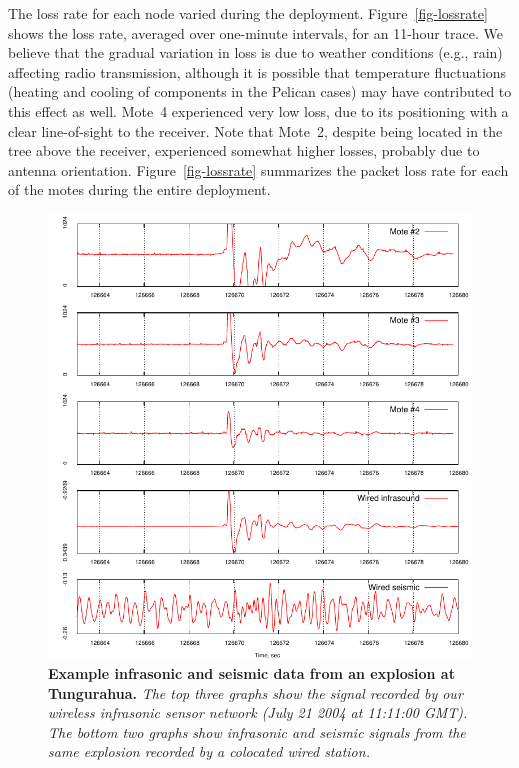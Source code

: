 The loss rate for each node varied during the deployment.
Figure~\ref{fig-lossrate} shows the loss rate, averaged over
one-minute intervals, for an 11-hour trace. We believe that the
gradual variation in loss is due to weather conditions (e.g., rain)
affecting radio transmission, although it is possible that temperature
fluctuations (heating and cooling of components in the Pelican cases)
may have contributed to this effect as well.
Mote~4 experienced very low loss, due 
to its positioning with a clear line-of-sight to the receiver.
Note that Mote~2, despite being located in the tree above the receiver,
experienced somewhat higher losses, probably due to antenna orientation.
Figure~\ref{fig-lossrate} summarizes the packet loss rate for each 
of the motes during the entire deployment.




\begin{figure}[t]
\begin{center}
\includegraphics[width=0.7\hsize]{./figures/explosion/explosion.pdf}
\end{center}
\caption{\small {\bf Example infrasonic and seismic data from an
explosion at Tungurahua.} {\em The top three graphs show the signal
recorded by our wireless infrasonic sensor network
(July 21 2004 at 11:11:00 GMT).
The bottom two graphs show infrasonic and seismic signals from the
same explosion recorded by a colocated wired station.}}
\label{fig-explosion}
\end{figure}

